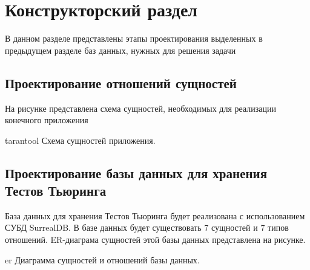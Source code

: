 \section{Конструкторский раздел}
В данном разделе представлены этапы проектирования выделенных в  
предыдущем разделе баз данных, нужных для решения задачи

\subsection{Проектирование отношений сущностей}  

На рисунке представлена схема сущностей, необходимых для реализации конечного приложения

\img{100mm}
{tarantool}
{Схема сущностей приложения.}

\subsection{Проектирование базы данных для хранения Тестов Тьюринга}  
База данных для хранения Тестов Тьюринга будет реализована с использованием СУБД SurrealDB. В базе данных будет существовать 7 сущностей и 7 типов отношений. ER-диаграма сущностей этой базы данных представлена на рисунке.  

\img{100mm}
{er}
{Диаграмма сущностей и отношений базы данных.}

